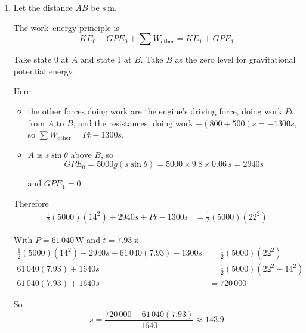 \documentclass[leqno]{article}
\begin{document}
\begin{enumerate}[
  label=\textbf{\arabic*.},
  leftmargin=*,
  topsep=0pt,
  partopsep=0pt,
  parsep=0pt
]
\begin{djsSolution}
\begin{enumerate}[label=\textbf{(\alph*)}, start=1]
  Take the direction down the slope as positive.

  With driving force $F\,\mathrm{N}$ at speed $v\,\mathrm{m\,s^{-1}}$, the power is
  \[
  P=Fv
  \]

  Resolving forces down the slope for the lorry-trailer combination at $A$:
  \[
  F+5000g\sin\theta-(800+500)=5000(1.2)
  \]

  Substitute $g=9.8$ and $\sin\theta=0.06$:
  \[
  F+5000(9.8)(0.06)-1300=6000
  \]
  \[
  F+2940-1300=6000
  \]
  \[
  F=4360
  \]

  Hence
  \[
  P=Fv=4360\times 14=61\,040\,\mathrm{W}
  \]

  So the power developed by the engine is
  \[
  61.04\,\mathrm{kW}
  \]

  \item Let the distance $AB$ be $s\,\mathrm{m}$.

  The work--energy principle is
  \[
  KE_0+GPE_0+\sum W_{\text{other}}=KE_1+GPE_1
  \]

  Take state 0 at $A$ and state 1 at $B$. Take $B$ as the zero level for gravitational potential energy.

  Here:
  \begin{itemize}
    \item the other forces doing work are the engine's driving force, doing work $Pt$ from $A$ to $B$, and the resistances, doing work $-(800+500)s=-1300s$, so $\sum W_{\text{other}}=Pt-1300s$,
    \item $A$ is $s\sin\theta$ above $B$, so
    \[
    GPE_0=5000g(s\sin\theta)=5000\times 9.8\times 0.06\,s=2940s
    \]

    and $GPE_1=0$.
  \end{itemize}

  Therefore
  \begin{align*}
  \frac12(5000)(14^2)+2940s+Pt-1300s
  &=\frac12(5000)(22^2)
  \end{align*}

  With $P=61\,040\,\mathrm{W}$ and $t=7.93\,\mathrm{s}$:
  \begin{align*}
  \frac12(5000)(14^2)+2940s+61\,040(7.93)-1300s
  &=\frac12(5000)(22^2)
  \\
  61\,040(7.93)+1640s
  &=\frac12(5000)(22^2-14^2)
  \\
  61\,040(7.93)+1640s
  &=720\,000
  \end{align*}

  So
  \[
  s=\frac{720\,000-61\,040(7.93)}{1640}\approx 143.9
  \]


\end{enumerate}
\end{djsSolution}
\end{enumerate}
\end{document}
